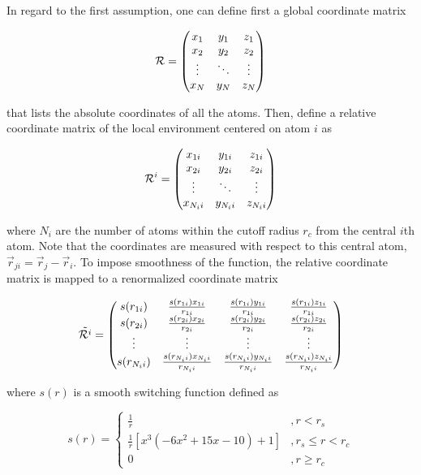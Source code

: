 In regard to the first assumption, one can define first a global coordinate
matrix

\begin{equation}
    \mathcal{R} =  \mqty( x_1 & y_1 & z_1 \\ x_2 & y_2 & z_2 \\ \vdots & \ddots
    &
    \vdots \\
    x_N & y_N & z_N)
\end{equation}

that lists the absolute coordinates of all the atoms. Then, define a relative
coordinate matrix of the local environment centered on atom  $i$ as

\begin{equation}
    \mathcal{R}^i =  \mqty( x_{1i} & y_{1i} & z_{1i} \\ x_{2i} & y_{2i} &
    z_{2i}
    \\ \vdots & \ddots
    &
    \vdots \\
    x_{N_i i} & y_{N_i i} & z_{N_i i})
\end{equation}

where $N_i$ are the number of atoms within the cutoff radius $r_c$ from the
central $i$th atom. Note that the coordinates are measured with respect to this
central atom, $\vec{r}_{ji} = \vec{r}_{j}- \vec{r}_{i}$. To impose smoothness
of the function, the relative coordinate matrix is mapped to  a renormalized
coordinate matrix

\begin{equation}
    \tilde{\mathcal{R}^i} =  \mqty( s(r_{1i}) &
    \frac{s(r_{1i}) x_{1i}}{r_{1i}}
    &	 \frac{s(r_{1i}) y_{1i}}{r_{1i}} &
    \frac{s(r_{1i}) z_{1i}}{r_{1i}} \\
    s(r_{2i}) &
    \frac{s(r_{2i}) x_{2i}}{r_{2i}}
    &	 \frac{s(r_{2i}) y_{2i}}{r_{2i}} &
    \frac{s(r_{2i}) z_{2i}}{r_{2i}}
    \\ \vdots & \vdots & \vdots
    &
    \vdots \\
    s(r_{N_i i}) &
    \frac{s(r_{N_i i}) x_{N_i i}}{r_{N_i i}}
    &	 \frac{s(r_{N_i i}) y_{N_i i}}{r_{N_i i}} &
    \frac{s(r_{N_i i}) z_{N_i i}}{r_{N_i i}} )
\end{equation}

where $s(r)$ is a smooth switching function defined as

\begin{equation}
    s(r) = \begin{cases}
        \frac{1}{r}                                   & , r   < r_s        \\
        \frac{1}{r} \left[x^3 (-6x^2+15x-10)+1\right] & , r_s \leq r < r_c \\
        0                                             & , r   \geq r_c
    \end{cases}
\end{equation}

